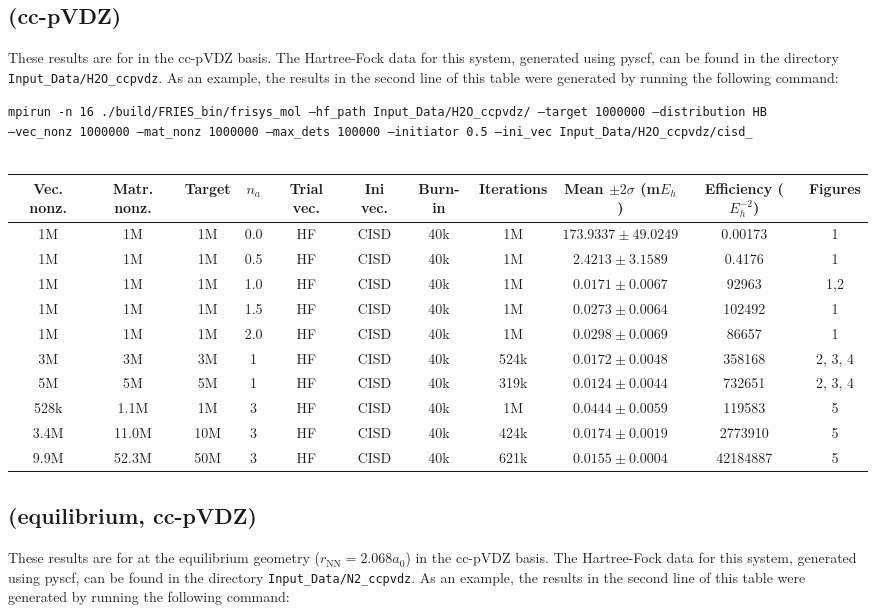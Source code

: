 \documentclass[12pt, landscape]{article}
\begin{document}
\subsection*{ (cc-pVDZ)}
These results are for  in the cc-pVDZ basis. The Hartree-Fock data for this system, generated using pyscf, can be found in the directory \texttt{Input\_Data/H2O\_ccpvdz}. As an example, the results in the second line of this table were generated by running the following command:

\texttt{mpirun -n 16 ./build/FRIES\_bin/frisys\_mol --hf\_path Input\_Data/H2O\_ccpvdz/ --target 1000000 --distribution HB}\\ \texttt{--vec\_nonz 1000000 --mat\_nonz 1000000 --max\_dets 100000 --initiator 0.5 --ini\_vec Input\_Data/H2O\_ccpvdz/cisd\_}
\\~\\
\begin{tabular}{c|c|c|c|c|c|c|c|c|c|c}
Vec. nonz. & Matr. nonz. & Target & $n_a$ & Trial vec. & Ini vec. & Burn-in & Iterations & Mean $\pm 2 \sigma$ (m$E_h$) & Efficiency ($E_h^{-2}$) & Figures \\ \hline
1M & 1M & 1M & 0.0 & HF & CISD & 40k & 1M & $173.9337 \pm 49.0249$ & 0.00173 & 1 \\
1M & 1M & 1M & 0.5 & HF & CISD & 40k & 1M & $2.4213 \pm 3.1589$ & 0.4176 & 1 \\
1M & 1M & 1M & 1.0 & HF & CISD & 40k & 1M & $0.0171 \pm 0.0067$ & 92963 & 1,2 \\
1M & 1M & 1M & 1.5 & HF & CISD & 40k & 1M & $0.0273 \pm 0.0064$ & 102492 & 1 \\
1M & 1M & 1M & 2.0 & HF & CISD & 40k & 1M & $0.0298 \pm 0.0069$ & 86657 & 1 \\
3M & 3M & 3M & 1 & HF & CISD & 40k & 524k & $0.0172 \pm 0.0048$ & 358168 & 2, 3, 4\\
5M & 5M & 5M & 1 & HF & CISD & 40k & 319k & $0.0124 \pm 0.0044$ & 732651 & 2, 3, 4\\
528k & 1.1M & 1M & 3 & HF & CISD & 40k & 1M & $0.0444 \pm 0.0059$ & 119583 & 5 \\
3.4M & 11.0M & 10M & 3 & HF & CISD & 40k &424k & $0.0174 \pm 0.0019$ & 2773910 & 5 \\
9.9M & 52.3M & 50M & 3 & HF & CISD & 40k & 621k & $0.0155 \pm 0.0004$ & 42184887 & 5 \\
\end{tabular}


\subsection*{ (equilibrium, cc-pVDZ)}
These results are for  at the equilibrium geometry ($r_\text{NN} = 2.068 a_0$) in the cc-pVDZ basis. The Hartree-Fock data for this system, generated using pyscf, can be found in the directory \texttt{Input\_Data/N2\_ccpvdz}. As an example, the results in the second line of this table were generated by running the following command:
\end{document}
